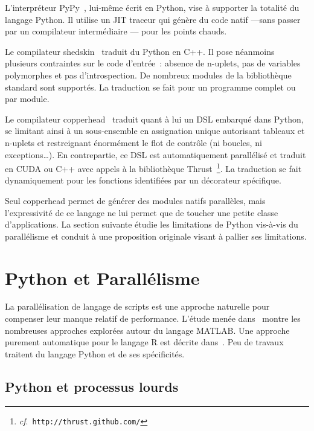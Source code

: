 \documentclass[renpar]{compas2013}
\begin{document}
L'interpréteur PyPy~\cite{pypy2009}, lui-même écrit en Python, vise à
supporter la totalité du langage Python. Il utilise un JIT traceur qui
génère du code natif ---sans passer par un compilateur intermédiaire ---
pour les points chauds.

Le compilateur shedskin~\cite{shedskin2006} traduit du Python en C++. Il
pose néanmoins plusieurs contraintes sur le code d'entrée~: absence de
n-uplets, pas de variables polymorphes et pas d'introspection. De nombreux
modules de la bibliothèque standard sont supportés. La traduction se fait
pour un programme complet ou par module.

Le compilateur copperhead~\cite{copperhead2011} traduit quant à lui un DSL
embarqué dans Python, se limitant ainsi à un sous-ensemble en assignation
unique autorisant tableaux et n-uplets et restreignant énormément le flot
de contrôle (ni boucles, ni exceptions\dots). En contrepartie, ce DSL est
automatiquement parallélisé et traduit en CUDA ou C++ avec appels à la
bibliothèque Thrust~\footnote{\emph{cf}.\
\texttt{http://thrust.github.com/}}. La traduction se fait dynamiquement
pour les fonctions identifiées par un décorateur spécifique.

Seul copperhead permet de générer des modules natifs parallèles, mais
l'expressivité de ce langage ne lui permet que de toucher une petite
classe d'applications. La section suivante étudie les limitations de
Python vis-à-vis du parallélisme et conduit à une proposition originale
visant à pallier ses limitations.

\section{Python et Parallélisme}\label{sec:python-parallelism}

La parallélisation de langage de scripts est une approche naturelle pour
compenser leur manque relatif de performance. L'étude menée
dans~\cite{choy05} montre les nombreuses approches explorées autour du
langage MATLAB. Une approche purement automatique pour le langage R est
décrite dans~\cite{mals07}. Peu de travaux traitent du langage Python et
de ses spécificités.

\subsection{Python et processus lourds}
\end{document}
